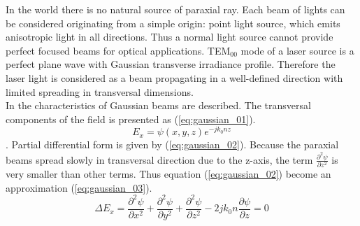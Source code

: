 In the world there is no natural source of paraxial ray. Each beam of lights can be considered originating from a simple origin: point light source, which emits anisotropic light in all directions. Thus a normal light source cannot provide perfect focused beams for optical applications. 
TEM$_{00}$ mode of a laser source is a perfect plane wave with Gaussian transverse irradiance profile\cite{CVI_Melles_Griot_Technical_Guide}. Therefore the laser light is considered as a beam propagating in a well-defined direction with limited spreading in transversal dimensions.\\ 
In \cite{ script_FT_TET} the characteristics of Gaussian beams are described. The transversal components of the field is presented as (\ref{eq:gaussian_01}). 
\begin{equation}
E_{x}=\psi(x,y,z)e^{-jk_{0}nz}
\label{eq:gaussian_01}
\end{equation}.
Partial differential form is given by (\ref{eq:gaussian_02}). Because the paraxial beams spread slowly in transversal direction due to the z-axis, the term $\frac{\partial ^{2}\psi}{\partial z^2}$ is very smaller than other terms. Thus equation (\ref{eq:gaussian_02}) become an approximation (\ref{eq:gaussian_03}).
\begin{equation}
\Delta E_{x}=\frac{\partial ^{2}\psi}{\partial x^2}+\frac{\partial ^{2}\psi}{\partial y^2}+\frac{ \partial ^{2}\psi}{\partial z^2}-2jk_{0}n\frac{\partial\psi}{\partial z}=0
\label{eq:gaussian_02}
\end{equation}

